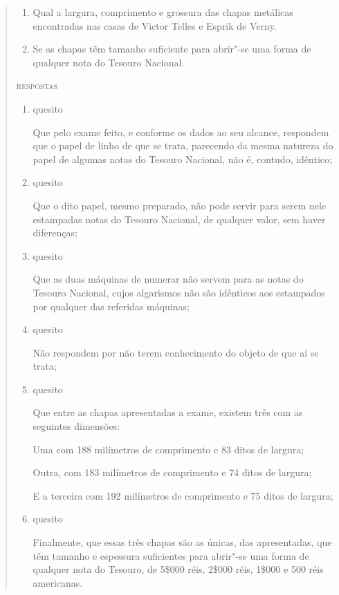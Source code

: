 \begin{quote}
\begin{enumerate}[label=\arabic*º]
\item\mbox{} Qual a largura, comprimento e grossura das chapas metálicas
encontradas nas casas de Victor Telles e Esprik de Verny.

\item\mbox{} Se as chapas têm tamanho suficiente para abrir"-se uma forma de
qualquer nota do Tesouro Nacional.
\end{enumerate}

\begin{center}
\textsc{respostas}
\end{center}

\begin{enumerate}[label= Ao \arabic*º]
\item\mbox{} quesito

Que pelo exame feito, e conforme os dados ao seu alcance, respondem que
o papel de linho de que se trata, parecendo da mesma natureza do papel
de algumas notas do Tesouro Nacional, não é, contudo, idêntico;

\item\mbox{} quesito

Que o dito papel, mesmo preparado, não pode servir para serem nele
estampadas notas do Tesouro Nacional, de qualquer valor, sem haver
diferenças;

\item\mbox{} quesito

Que as duas máquinas de numerar não servem para as notas do Tesouro
Nacional, cujos algarismos não são idênticos aos estampados por qualquer
das referidas máquinas;

\item\mbox{} quesito

Não respondem por não terem conhecimento do objeto de que aí se trata;

\item\mbox{} quesito

Que entre as chapas apresentadas a exame, existem três com as seguintes
dimensões:

Uma com 188 milímetros de comprimento e 83 ditos de largura;

Outra, com 183 milímetros de comprimento e 74 ditos de largura;

E a terceira com 192 milímetros de comprimento e 75 ditos de largura;

\item\mbox{} quesito

Finalmente, que essas três chapas são as únicas, das apresentadas, que
têm tamanho e espessura suficientes para abrir"-se uma forma de qualquer
nota do Tesouro, de 5\$000 réis, 2\$000 réis, 1\$000 e 500 réis
americanas.
\end{enumerate}


\end{quote}
